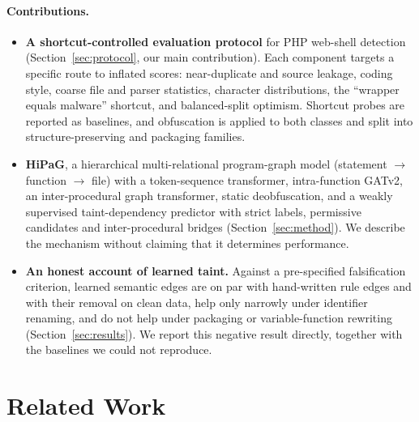 \documentclass[pdflatex,sn-mathphys-num]{sn-jnl}
\begin{document}
\paragraph{Contributions.}
\begin{itemize}
  \item \textbf{A shortcut-controlled evaluation protocol} for PHP web-shell
  detection (Section~\ref{sec:protocol}, our main contribution). Each component
  targets a specific route to inflated scores: near-duplicate and source
  leakage, coding style, coarse file and parser statistics, character
  distributions, the ``wrapper equals malware'' shortcut, and balanced-split
  optimism. Shortcut probes are reported as baselines, and obfuscation is
  applied to both classes and split into structure-preserving and packaging
  families.
  \item \textbf{HiPaG}, a hierarchical multi-relational program-graph model
  (statement $\rightarrow$ function $\rightarrow$ file) with a token-sequence
  transformer, intra-function GATv2, an inter-procedural graph transformer,
  static deobfuscation, and a weakly supervised taint-dependency predictor with
  strict labels, permissive candidates and inter-procedural bridges
  (Section~\ref{sec:method}). We describe the mechanism without claiming that
  it determines performance.
  \item \textbf{An honest account of learned taint.} Against a pre-specified
  falsification criterion, learned semantic edges are on par with hand-written
  rule edges and with their removal on clean data, help only narrowly under
  identifier renaming, and do not help under packaging or variable-function
  rewriting (Section~\ref{sec:results}). We report this negative result
  directly, together with the baselines we could not reproduce.
\end{itemize}

\section{Related Work}\label{sec:related}
\end{document}

